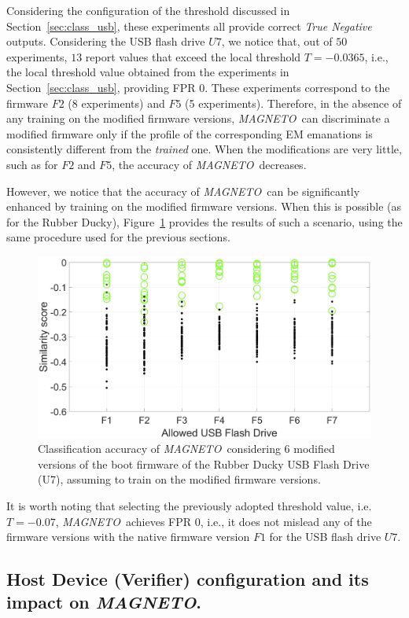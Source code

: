 \documentclass[acmsmall, authorversion]{acmart}
\newcommand{\sol}{\emph{MAGNETO}}
\begin{document}
Considering the configuration of the threshold discussed in Section~\ref{sec:class_usb}, these experiments all provide correct \emph{True Negative} outputs. Considering the USB flash drive $U7$, we notice that, out of $50$ experiments, $13$ report values that exceed the local threshold $T=-0.0365$, i.e., the local threshold value obtained from the experiments in Section~\ref{sec:class_usb}, providing FPR $0$. 
These experiments correspond to the firmware $F2$ (8 experiments) and $F5$ (5 experiments). Therefore, in the absence of any training on the modified firmware versions, \sol\ can discriminate a modified firmware only if the profile of the corresponding EM emanations is consistently different from the \emph{trained} one. When the modifications are very little, such as for $F2$ and $F5$, the accuracy of \sol\ decreases.

However, we notice that the accuracy of \sol\ can be significantly enhanced by training on the modified firmware versions. When this is possible (as for the Rubber Ducky), Figure~\ref{fig:modifiedRD_trained} provides the results of such a scenario, using the same procedure used for the previous sections.
\begin{figure}[htbp]
    \includegraphics[width=.6\columnwidth]{Figures/modified_RD_trained_final.png}
    \centering
    \caption{Classification accuracy of \sol\ considering 6 modified versions of the boot firmware of the Rubber Ducky USB Flash Drive (U7), assuming to train on the modified firmware versions.}
    \label{fig:modifiedRD_trained}
\end{figure}
It is worth noting that selecting the previously adopted threshold value, i.e. $T=-0.07$, \sol\ achieves FPR $0$, i.e., it does not mislead any of the firmware versions with the native firmware version $F1$ for the USB flash drive $U7$.

\subsection{Host Device (Verifier) configuration and its impact on \sol.}
\label{sec:host_impact}
\end{document}
